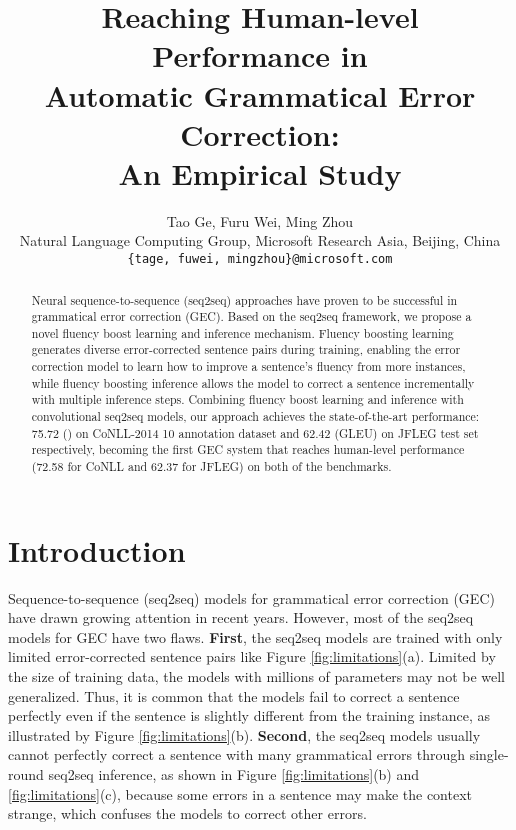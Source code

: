 \documentclass{article} \usepackage{MSRA_TR,times}
\title{Reaching Human-level Performance in \\ Automatic Grammatical Error Correction: \\  An Empirical Study}
\author{Tao Ge, Furu Wei, Ming Zhou \\
Natural Language Computing Group, Microsoft Research Asia, Beijing, China\\
\texttt{\{tage, fuwei, mingzhou\}@microsoft.com}
}
\begin{document}
\maketitle

\begin{abstract}
Neural sequence-to-sequence (seq2seq) approaches have proven to be successful in grammatical error correction (GEC). Based on the seq2seq framework, we propose a novel fluency boost learning and inference mechanism. Fluency boosting learning generates diverse error-corrected sentence pairs during training, enabling the error correction model to learn how to improve a sentence's fluency from more instances, while fluency boosting inference allows the model to correct a sentence incrementally with multiple inference steps. Combining fluency boost learning and inference with convolutional seq2seq models, our approach achieves the state-of-the-art performance: 75.72 () on CoNLL-2014 10 annotation dataset and 62.42 (GLEU) on JFLEG test set respectively, becoming the first GEC system that reaches human-level performance (72.58 for CoNLL and 62.37 for JFLEG) on both of the benchmarks.
\end{abstract}

\section{Introduction}\label{sec:intro}

Sequence-to-sequence (seq2seq) models \citep{cho-EtAl:2014:EMNLP2014,DBLP:journals/corr/SutskeverVL14} for grammatical error correction (GEC) have drawn growing attention  \citep{yuan2016grammatical,xie2016neural,ji2017nested,schmaltz-EtAl:2017:EMNLP2017,sakaguchi2017grammatical,chollampatt2018,junczys2018approaching} in recent years. However, most of the seq2seq models for GEC have two flaws. \textbf{First}, the seq2seq models are trained with only limited error-corrected sentence pairs like Figure \ref{fig:limitations}(a). Limited by the size of training data, the models with millions of parameters may not be well generalized. Thus, it is common that the models fail to correct a sentence perfectly even if the sentence is slightly different from the training instance, as illustrated by Figure \ref{fig:limitations}(b). \textbf{Second}, the seq2seq models usually cannot perfectly correct a sentence with many grammatical errors through single-round seq2seq inference, as shown in Figure \ref{fig:limitations}(b) and \ref{fig:limitations}(c), because some errors in a sentence may make the context strange, which confuses the models to correct other errors. 
\end{document}

